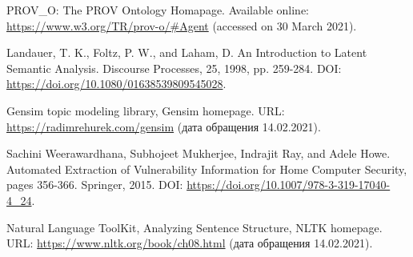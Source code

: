 \documentclass[../main]{subfiles}
\begin{document}
\begin{english}
\begin{biblenum}
     PROV\_O: The PROV Ontology Homapage. Available online: \url{https://www.w3.org/TR/prov-o/#Agent} (accessed on 30 March 2021).

     Landauer, T. K., Foltz, P. W., and Laham, D. An Introduction to Latent Semantic Analysis. Discourse Processes, 25, 1998, pp. 259-284. DOI: \url{https://doi.org/10.1080/01638539809545028}.

     Gensim topic modeling library, Gensim homepage. URL: \url{https://radimrehurek.com/gensim} (дата обращения 14.02.2021).

     Sachini Weerawardhana, Subhojeet Mukherjee, Indrajit Ray, and Adele Howe. Automated Extraction of Vulnerability Information for Home Computer Security, pages 356-366. Springer, 2015. DOI: \url{https://doi.org/10.1007/978-3-319-17040-4_24}.

     Natural Language ToolKit, Analyzing Sentence Structure, NLTK home\-page. URL: \url{https://www.nltk.org/book/ch08.html} (дата обращения 14.02.2021).


    






\end{biblenum}
\end{english}
\end{document}
